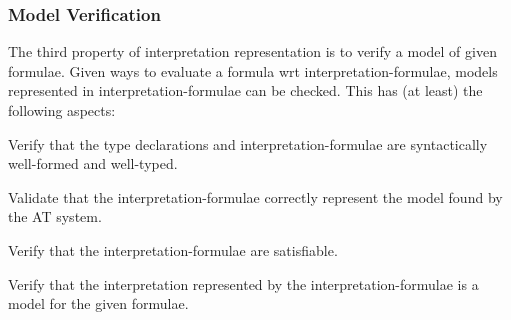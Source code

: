 \documentclass{ceurart}
\newenvironment{packed_enumerate}{
\vspace*{-0.3em}
\begin{enumerate}
\setlength{\partopsep}{0pt}
\setlength{\itemsep}{1pt}
\setlength{\parskip}{0pt}
\setlength{\parsep}{0pt}
}{\end{enumerate}}
\begin{document}
\subsubsection{Model Verification}
\label{Verification}

The third property of interpretation representation is to verify a model of given formulae.
Given ways to evaluate a formula wrt interpretation-formulae, models represented in
interpretation-formulae can be checked.
This has (at least) the following aspects: 
\begin{packed_enumerate}
\item Verify that the type declarations and interpretation-formulae are syntactically well-formed 
      and well-typed. 
\item Validate that the interpretation-formulae correctly represent the model found by the AT
      system.
\item Verify that the interpretation-formulae are satisfiable.
\item Verify that the interpretation represented by the interpretation-formulae is a model for 
      the given formulae.
\end{packed_enumerate}
\end{document}
